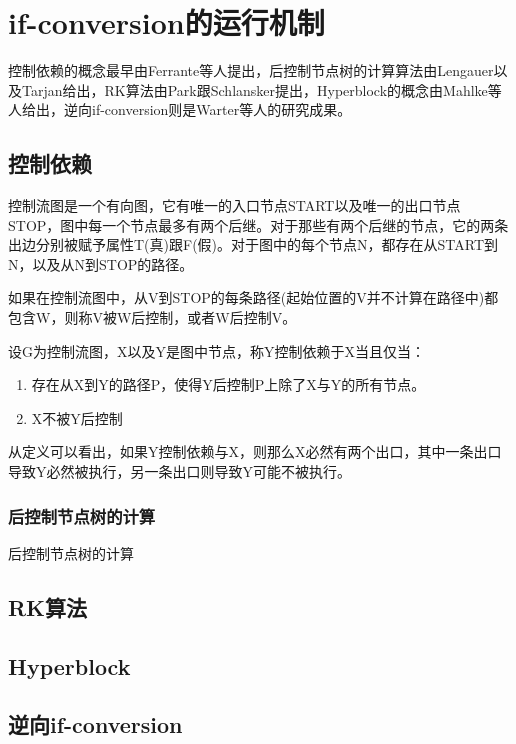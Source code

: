 \section{if-conversion的运行机制}

控制依赖的概念最早由Ferrante等人提出\cite{ferrante1987prodepgraitsuseopt}，后控制节点树的计算算法由Lengauer以及Tarjan给出\cite{Lengauer1979}，RK算法由Park跟Schlansker提出\cite{JosephC.H.Park1991}，Hyperblock的概念由Mahlke等人给出\cite{ScottA.Mahlke1992a}，逆向if-conversion则是Warter等人的研究成果\cite{Warter1993}。

\subsection{控制依赖}

\begin{definition}
控制流图是一个有向图，它有唯一的入口节点START以及唯一的出口节点STOP，图中每一个节点最多有两个后继。对于那些有两个后继的节点，它的两条出边分别被赋予属性T(真)跟F(假)。对于图中的每个节点N，都存在从START到N，以及从N到STOP的路径。
\end{definition}

\begin{definition}
如果在控制流图中，从V到STOP的每条路径(起始位置的V并不计算在路径中)都包含W，则称V被W后控制，或者W后控制V。
\end{definition}

\begin{definition}
设G为控制流图，X以及Y是图中节点，称Y控制依赖于X当且仅当：
\begin{enumerate}
\item 存在从X到Y的路径P，使得Y后控制P上除了X与Y的所有节点。
\item X不被Y后控制
\end{enumerate}
\end{definition}
从定义可以看出，如果Y控制依赖与X，则那么X必然有两个出口，其中一条出口导致Y必然被执行，另一条出口则导致Y可能不被执行。

\subsubsection{后控制节点树的计算}
后控制节点树的计算

\subsection{RK算法}
\subsection{Hyperblock}
\subsection{逆向if-conversion}